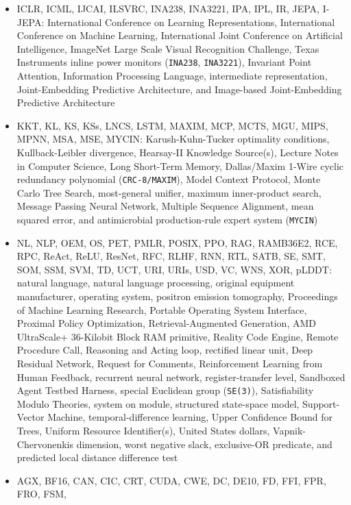 \documentclass[10pt,letterpaper]{article}
\begin{document}
\begin{itemize}
\item
  ICLR, ICML, IJCAI, ILSVRC, INA238, INA3221, IPA, IPL, IR, JEPA,
  I-JEPA: International Conference on Learning Representations,
  International Conference on Machine Learning, International Joint
  Conference on Artificial Intelligence, ImageNet Large Scale Visual
  Recognition Challenge, Texas Instruments inline power monitors
  (\texttt{INA238}, \texttt{INA3221}), Invariant Point Attention,
  Information Processing Language, intermediate representation,
  Joint-Embedding Predictive Architecture, and Image-based
  Joint-Embedding Predictive Architecture
\item
  KKT, KL, KS, KSs, LNCS, LSTM, MAXIM, MCP, MCTS, MGU, MIPS, MPNN, MSA,
  MSE, MYCIN: Karush-Kuhn-Tucker optimality conditions, Kullback-Leibler
  divergence, Hearsay-II Knowledge Source(s), Lecture Notes in Computer
  Science, Long Short-Term Memory, Dallas/Maxim 1-Wire cyclic redundancy
  polynomial (\texttt{CRC-\allowbreak{}8/\allowbreak{}MAXIM}), Model Context Protocol, Monte Carlo
  Tree Search, most-general unifier, maximum inner-product search,
  Message Passing Neural Network, Multiple Sequence Alignment, mean
  squared error, and antimicrobial production-rule expert system
  (\texttt{MYCIN})
\item
  NL, NLP, OEM, OS, PET, PMLR, POSIX, PPO, RAG, RAMB36E2, RCE, RPC,
  ReAct, ReLU, ResNet, RFC, RLHF, RNN, RTL, SATB, SE, SMT, SOM, SSM,
  SVM, TD, UCT, URI, URIs, USD, VC, WNS, XOR, pLDDT: natural language,
  natural language processing, original equipment manufacturer,
  operating system, positron emission tomography, Proceedings of Machine
  Learning Research, Portable Operating System Interface, Proximal
  Policy Optimization, Retrieval-Augmented Generation, AMD UltraScale+
  36-Kilobit Block RAM primitive, Reality Code Engine, Remote Procedure
  Call, Reasoning and Acting loop, rectified linear unit, Deep Residual
  Network, Request for Comments, Reinforcement Learning from Human
  Feedback, recurrent neural network, register-transfer level, Sandboxed
  Agent Testbed Harness, special Euclidean group (\texttt{SE(3)}),
  Satisfiability Modulo Theories, system on module, structured
  state-space model, Support-Vector Machine, temporal-difference
  learning, Upper Confidence Bound for Trees, Uniform Resource
  Identifier(s), United States dollars, Vapnik-Chervonenkis dimension,
  worst negative slack, exclusive-OR predicate, and predicted local
  distance difference test
\item
  AGX, BF16, CAN, CIC, CRT, CUDA, CWE, DC, DE10, FD, FFI, FPR, FRO, FSM,

\end{itemize}
\end{document}
